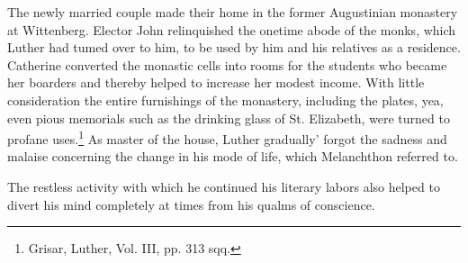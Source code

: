 The newly married couple made their home in the former Augustinian
monastery at Wittenberg. Elector John relinquished the onetime abode of
the monks, which Luther had tumed over to him,
to be used by him and his relatives as a residence. Catherine converted
the monastic cells into rooms for the students who became
her boarders and thereby helped to increase her modest income.
With little consideration the entire furnishings of the monastery,
including the plates, yea, even pious memorials such as the drinking
glass of St. Elizabeth, were turned to profane uses.\footnote
{Grisar, Luther, Vol. III, pp. 313 sqq.}
As master of
the house, Luther gradually’ forgot the sadness and malaise concerning
the change in his mode of life, which Melanchthon referred to.

The restless activity with which he continued his literary labors
also helped to divert his mind completely at times from his qualms
of conscience.
